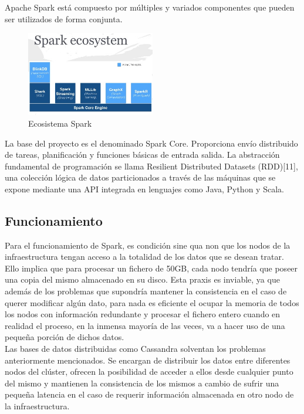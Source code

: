 Apache Spark está compuesto por múltiples y variados componentes que pueden ser utilizados de forma conjunta.\\

\begin{figure}[h]
	\centering
	\includegraphics[width=0.5\textwidth]{Ilustraciones/spark_ecosystem.png}
	\caption{Ecosistema Spark}
	\label{fig:ipanel}
\end{figure}

La base del proyecto es el denominado Spark Core. Proporciona envío distribuido de tareas, planificación y funciones básicas de entrada salida. La abstracción fundamental de programación se llama Resilient Distributed Datasets (RDD)[11], una colección lógica de datos particionados a través de las máquinas que se expone mediante una API integrada en lenguajes como Java, Python y Scala.\\

\subsection{Funcionamiento}

Para el funcionamiento de Spark, es condición sine qua non que los nodos de la infraestructura tengan acceso a la totalidad de los datos que se desean tratar. Ello implica que para procesar un fichero de 50GB, cada nodo tendría que poseer una copia del mismo almacenado en su disco. Esta praxis es inviable, ya que además de los problemas que supondría mantener la consistencia en el caso de querer modificar algún dato, para nada es eficiente el ocupar la memoria de todos los nodos con información redundante y procesar el fichero entero cuando en realidad el proceso, en la inmensa mayoría de las veces, va a hacer uso de una pequeña porción de dichos datos.\\

Las bases de datos distribuidas como Cassandra solventan los problemas anteriormente mencionados. Se encargan de distribuir los datos entre diferentes nodos del clúster, ofrecen la posibilidad de acceder a ellos desde cualquier punto del mismo y mantienen la consistencia de los mismos a cambio de sufrir una pequeña latencia en el caso de requerir información almacenada en otro nodo de la infraestructura.\\ 

